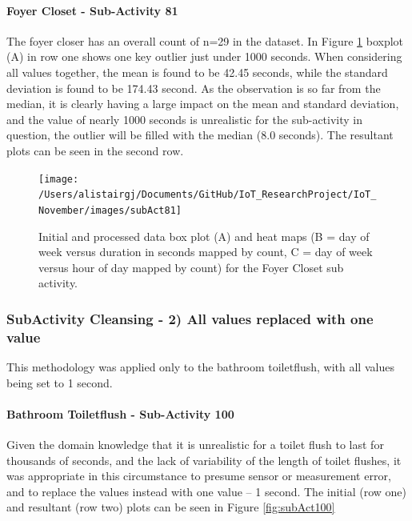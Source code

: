\documentclass[11pt,]{article}
\let\oldparagraph\paragraph
\renewcommand{\paragraph}[1]{\oldparagraph{#1}\mbox{}}
\begin{document}
\hypertarget{foyer-closet---sub-activity-81}{%
\paragraph{Foyer Closet - Sub-Activity
81}\label{foyer-closet---sub-activity-81}}

The foyer closer has an overall count of n=29 in the dataset. In Figure
\ref{fig:subAct81} boxplot (A) in row one shows one key outlier just
under 1000 seconds. When considering all values together, the mean is
found to be 42.45 seconds, while the standard deviation is found to be
174.43 second. As the observation is so far from the median, it is
clearly having a large impact on the mean and standard deviation, and
the value of nearly 1000 seconds is unrealistic for the sub-activity in
question, the outlier will be filled with the median (8.0 seconds). The
resultant plots can be seen in the second row.

\begin{figure}[H]

{\centering \texttt{[image: /Users/alistairgj/Documents/GitHub/IoT\_ResearchProject/IoT\_November/images/subAct81]} 

}

\caption{Initial and processed data box plot (A) and heat maps (B = day of week versus duration in seconds mapped by count, C = day of week versus hour of day mapped by count) for the Foyer Closet sub activity.}\label{fig:subAct81}
\end{figure}

\hypertarget{subactivity-cleansing---2-all-values-replaced-with-one-value}{%
\subsubsection{SubActivity Cleansing - 2) All values replaced with one
value}\label{subactivity-cleansing---2-all-values-replaced-with-one-value}}

This methodology was applied only to the bathroom toiletflush, with all
values being set to 1 second.

\hypertarget{bathroom-toiletflush---sub-activity-100}{%
\paragraph{Bathroom Toiletflush - Sub-Activity
100}\label{bathroom-toiletflush---sub-activity-100}}

Given the domain knowledge that it is unrealistic for a toilet flush to
last for thousands of seconds, and the lack of variability of the length
of toilet flushes, it was appropriate in this circumstance to presume
sensor or measurement error, and to replace the values instead with one
value -- 1 second. The initial (row one) and resultant (row two) plots
can be seen in Figure \ref{fig:subAct100}
\end{document}
